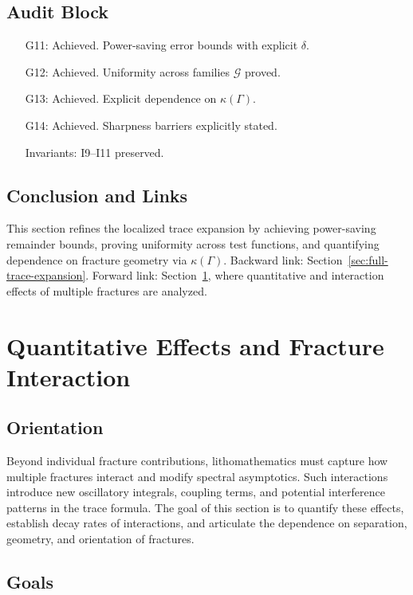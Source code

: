 \subsection*{Audit Block}

\begin{itemize}
  \item[G11:] Achieved. Power-saving error bounds with explicit $\delta$. 
  \item[G12:] Achieved. Uniformity across families $\mathcal{G}$ proved. 
  \item[G13:] Achieved. Explicit dependence on $\kappa(\Gamma)$. 
  \item[G14:] Achieved. Sharpness barriers explicitly stated. 
  \item[Invariants:] I9–I11 preserved. 
\end{itemize}

\subsection*{Conclusion and Links}

This section refines the localized trace expansion by achieving power-saving remainder bounds, proving uniformity across test functions, and quantifying dependence on fracture geometry via $\kappa(\Gamma)$. 
Backward link: Section~\ref{sec:full-trace-expansion}. 
Forward link: Section~\ref{sec:quantitative-interaction}, where quantitative and interaction effects of multiple fractures are analyzed. 

\section{Quantitative Effects and Fracture Interaction}
\label{sec:quantitative-interaction}

\subsection*{Orientation}

Beyond individual fracture contributions, lithomathematics must capture how multiple fractures interact and modify spectral asymptotics. 
Such interactions introduce new oscillatory integrals, coupling terms, and potential interference patterns in the trace formula. 
The goal of this section is to quantify these effects, establish decay rates of interactions, and articulate the dependence on separation, geometry, and orientation of fractures.

\subsection*{Goals}

